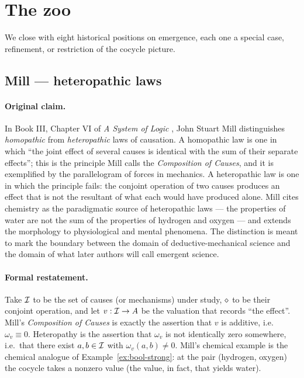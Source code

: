 \section{The zoo}\label{sec:zoo}

We close with eight historical positions on emergence, each one a special
case, refinement, or restriction of the cocycle picture.

\subsection{Mill --- heteropathic laws}\label{sec:zoo:mill}

\paragraph{Original claim.} In Book III, Chapter VI of \emph{A System of
Logic} \cite{Mill1843}, John Stuart Mill distinguishes
\emph{homopathic} from \emph{heteropathic} laws of causation. A homopathic
law is one in which ``the joint effect of several causes is identical with
the sum of their separate effects''; this is the principle Mill calls the
\emph{Composition of Causes}, and it is exemplified by the parallelogram of
forces in mechanics. A heteropathic law is one in which the principle
fails: the conjoint operation of two causes produces an effect that is not
the resultant of what each would have produced alone. Mill cites chemistry
as the paradigmatic source of heteropathic laws --- the properties of
water are not the sum of the properties of hydrogen and oxygen --- and
extends the morphology to physiological and mental phenomena. The
distinction is meant to mark the boundary between the domain of
deductive-mechanical science and the domain of what later authors will
call emergent science.

\paragraph{Formal restatement.} Take $\mathcal{I}$ to be the set of causes (or
mechanisms) under study, $\mathbin{\diamond}$ to be their conjoint operation, and let
$v : \mathcal{I} \to A$ be the valuation that records ``the effect''. Mill's
\emph{Composition of Causes} is exactly the assertion that $v$ is additive,
i.e.\ $\omega_v \equiv 0$. Heteropathy is the assertion that $\omega_v$ is
not identically zero somewhere, i.e.\ that there exist $a, b \in \mathcal{I}$
with $\omega_v(a, b) \ne 0$. Mill's chemical example is the chemical
analogue of Example~\ref{ex:bool-strong}: at the pair (hydrogen, oxygen)
the cocycle takes a nonzero value (the value, in fact, that yields water).

